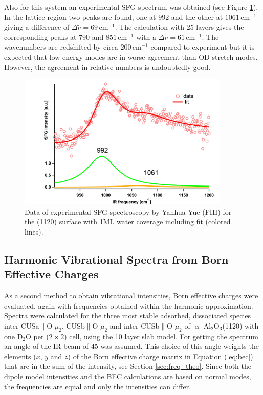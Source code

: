 \documentclass[11pt,DIV=13,BCOR=5mm,a4paper,headinclude]{scrbook}
\begin{document}
Also for this system an experimental SFG spectrum was obtained (see Figure \ref{abb:exp-sfg_fully}).
In the lattice region two peaks are found, one at $992$ and the other at $1061\,$cm$^{-1}$ giving a difference of $\Delta \tilde{\nu}=69\,$cm$^{-1}$.
The calculation with 25 layers gives the corresponding peaks at $790$ and $851\,$cm$^{-1}$ %
with a $\Delta \tilde{\nu}=61\,$cm$^{-1}$.
The wavenumbers are redshifted by circa $200\,$cm$^{-1}$ compared to experiment but it is expected that low energy modes are in worse agreement than OD stretch modes.
However, the agreement in relative numbers is undoubtedly good.
\begin{figure}[!h]
 \centering
\includegraphics[width=0.9\textwidth]{figures/11-20/ssp_UHV_200K_fit_hydrox.jpg}
 \caption{Data of experimental SFG spectroscopy by Yanhua Yue (FHI) for the (11\=20) surface with 1ML water coverage including fit (colored lines).}
        \label{abb:exp-sfg_fully}
 \end{figure}
\clearpage


\subsection{Harmonic Vibrational Spectra from Born Effective Charges}\label{bec}
As a second method to obtain vibrational intensities, Born effective charges were evaluated, again with frequencies obtained within the harmonic approximation.
Spectra were calculated for the three most stable adsorbed, dissociated species inter-CUSa$\parallel$O-$\mu_2$, CUSb$\parallel$O-$\mu_2$ and inter-CUSb$\parallel$O-$\mu_2$ of $\upalpha$-Al$_2$O$_3$(11\=20) with one D$_2$O per ($2\times 2$) cell, using the 10 layer slab model.
For getting the spectrum an angle of the IR beam of 45\textdegree{} was assumed.
This choice of this angle weights the elements ($x$, $y$ and $z$) of the Born effective charge matrix in Equation (\ref{eq:bec}) that are in the sum of the intensity, see Section \ref{sec:freq_theo}.
Since both the dipole model intensities and the BEC calculations are based on normal modes, the frequencies are equal and only the intensities can differ.
\end{document}
